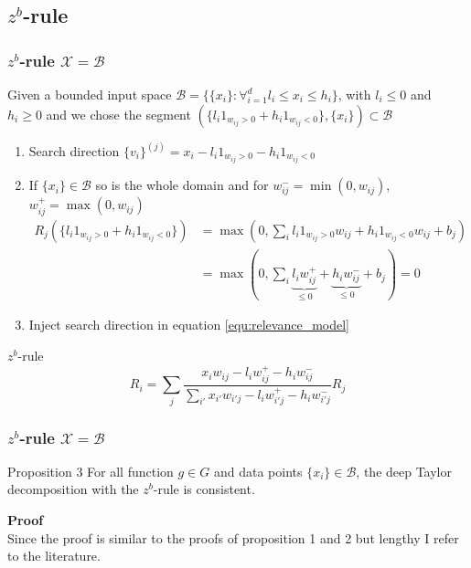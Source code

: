 \documentclass{beamer}
\begin{document}
\subsection[$z^b$-rule]{$z^b$-rule}


\begin{frame}
\frametitle{$z^b$-rule $\mathcal{X}=\mathcal{B}$}
\vspace{0.4cm}
Given a bounded input space $\mathcal{B} = \{\{x_i\} : \forall_{i=1}^d l_i\leq x_i \leq h_i\} $, with $l_i \leq 0$ and $ h_i \geq 0$ and we chose the segment $(\{l_i 1_{w_{ij}>0} + h_i 1_{w_{ij}<0}\},\{x_i\})\subset \mathcal{B}$\\
\begin{enumerate}
	\item Search direction $\{v_i\}^{(j)} = x_i - l_i 1_{w_{ij}>0} - h_i 1_{w_{ij}<0}$
	\item If $\{x_i\} \in \mathcal{B}$ so is the whole domain and for $w_{ij}^-=\min(0,w_{ij})$, $w_{ij}^+=\max(0,w_{ij})$
	\vspace{-0.25cm}
	\begin{align*}
		R_j(\{l_i 1_{w_{ij}>0} + h_i 1_{w_{ij}<0}\}) &= \max(0, \sum_i l_i 1_{w_{ij}>0} w_{ij} + h_i 1_{w_{ij}<0} w_{ij} + b_j)\\
		&=\max(0, \sum_i \underbrace{l_i w_{ij}^+}_{\leq 0} + \underbrace{h_i w_{ij}^-}_{\leq 0} + b_j)= 0
	\end{align*}
	\vspace{-0.75cm}
	\item Inject search direction in equation \eqref{equ:relevance_model}
\end{enumerate}

\pause
\vspace{-0.15cm}
\begin{block}{$z^b$-rule}
\begin{equation*}
R_i =  \sum_j \frac{x_i w_{ij} - l_i w_{ij}^+ - h_i w_{ij}^-}{\sum_{i'} x_{i'} w_{i'j}  - l_i w_{i'j}^+ - h_i w_{i'j}^-} R_j
\end{equation*}
\end{block}
\end{frame}



\begin{frame}
\frametitle{$z^b$-rule $\mathcal{X}=\mathcal{B}$}
\vspace{-0.4cm}
\begin{block}{Proposition 3}
For all function $g \in G$ and data points $\{x_i\} \in \mathcal{B}$, the deep Taylor decomposition with the $z^b$-rule is consistent.
\end{block}
\vspace{0.5cm}
\textbf{Proof}\\
Since the proof is similar to the proofs of proposition 1 and 2 but lengthy I refer to the literature.

\end{frame}
\end{document}
